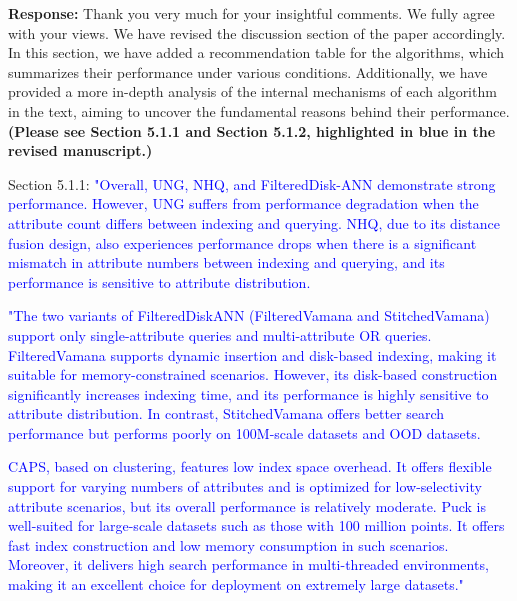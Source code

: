 \documentclass[sigconf, nonacm]{acmart}
\newcounter{weakness}[section]
\begin{document}
\noindent
\textbf{Response:} 
%
Thank you very much for your insightful comments. We fully agree with your views. We have revised the discussion section of the paper accordingly. In this section, we have added a recommendation table for the algorithms, which summarizes their performance under various conditions. Additionally, we have provided a more in-depth analysis of the internal mechanisms of each algorithm in the text, aiming to uncover the fundamental reasons behind their performance.
\textbf{(Please see Section 5.1.1 and Section 5.1.2, highlighted in blue in the revised manuscript.)}

Section 5.1.1: \textcolor{blue}{
	"Overall, UNG, NHQ, and FilteredDisk-ANN demonstrate strong performance. However, UNG suffers from performance degradation when the attribute count differs between indexing and querying. NHQ, due to its distance fusion design, also experiences performance drops when there is a significant mismatch in attribute numbers between indexing and querying, and its performance is sensitive to attribute distribution. }

\textcolor{blue}{"The two variants of FilteredDiskANN (FilteredVamana and StitchedVamana) support only single-attribute queries and multi-attribute OR queries. FilteredVamana supports dynamic insertion and disk-based indexing, making it suitable for memory-constrained scenarios. However, its disk-based construction significantly increases indexing time, and its performance is highly sensitive to attribute distribution. In contrast, StitchedVamana offers better search performance but performs poorly on 100M-scale datasets and OOD datasets.}

\textcolor{blue}{
	CAPS, based on clustering, features low index space overhead. It offers flexible support for varying numbers of attributes and is optimized for low-selectivity attribute scenarios, but its overall performance is relatively moderate.
	Puck is well-suited for large-scale datasets such as those with 100 million points. It offers fast index construction and low memory consumption in such scenarios. Moreover, it delivers high search performance in multi-threaded environments, making it an excellent choice for deployment on extremely large datasets."}
\end{document}
